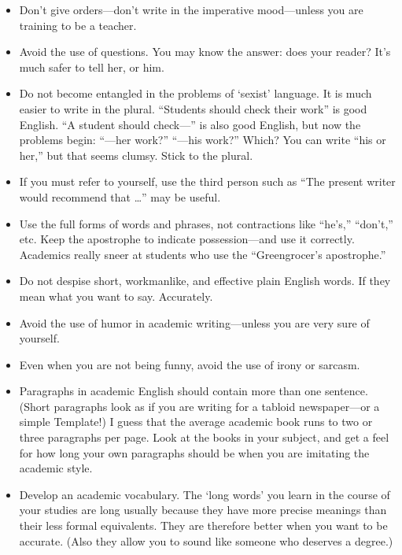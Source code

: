 \begin{itemize}
\item Don't give orders---don't write in the imperative mood---unless you are training to be a teacher.
\item Avoid the use of questions. You may know the answer: does your reader?
It's much safer to tell her, or him.
\item Do not become entangled in the problems of `sexist' language.
It is much easier to write in the plural.
``Students should check their work'' is good English.
``A student should check---'' is also good English, but now the problems begin: ``---her work?'' ``---his work?''
Which? You can write ``his or her,'' but that seems clumsy. Stick to the plural.
\item If you must refer to yourself, use the third person such as ``The present writer would recommend that \ldots'' may be useful.
\item Use the full forms of words and phrases, not contractions like ``he's,'' ``don't,'' etc.
Keep the apostrophe to indicate possession---and use it correctly.
Academics really sneer at students who use the ``Greengrocer's apostrophe.''
\end{itemize}


\begin{itemize}
\item Do not despise short, workmanlike, and effective plain English words.
If they mean what you want to say. Accurately.
\item Avoid the use of humor in academic writing---unless you are very sure of yourself.
\item Even when you are not being funny, avoid the use of irony or sarcasm.
\item Paragraphs in academic English should contain more than one sentence.
(Short paragraphs look as if you are writing for a tabloid newspaper---or a simple Template!)
I guess that the average academic book runs to two or three paragraphs per page.
Look at the books in your subject, and get a feel for how long your own paragraphs should be when you are imitating the academic style.
\item Develop an academic vocabulary.
The `long words' you learn in the course of your studies are long usually because they have more precise meanings than their less formal equivalents.
They are therefore better when you want to be accurate.
(Also they allow you to sound like someone who deserves a degree.)
\end{itemize}



